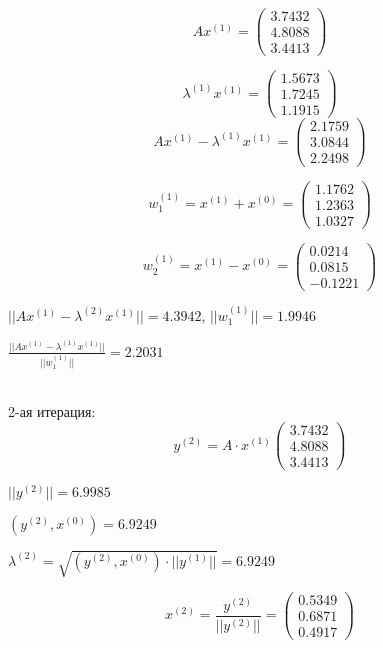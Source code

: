 \documentclass{article}
\begin{document}
	\[Ax^{(1)} =							
	\left(
	\begin{array}{ccc}
		3.7432 \\
		4.8088 \\
		3.4413
	\end{array}
	\right) \]
	
	\[\lambda^{(1)} x^{(1)} =							
	\left(
	\begin{array}{ccc}
		1.5673 \\
		1.7245 \\
		1.1915
	\end{array}
	\right) \]
	\[Ax^{(1)} - \lambda^{(1)} x^{(1)} =							
	\left(
	\begin{array}{ccc}
		2.1759 \\
		3.0844 \\
		2.2498
	\end{array}
	\right) \]
	
	
	\[w^{(1)}_1 =x^{(1)} +  x^{(0)}=							
	\left(
	\begin{array}{ccc}
		1.1762 \\
		1.2363 \\
		1.0327
	\end{array}
	\right) \]
	
	\[w^{(1)}_2 =x^{(1)} -  x^{(0)}=							
	\left(
	\begin{array}{ccc}
		0.0214 \\
		0.0815 \\
		-0.1221 
	\end{array}
	\right) \]
	
	$||Ax^{(1)} - \lambda^{(2)} x^{(1)}|| = 4.3942$,
	$||w^{(1)}_1|| = 1.9946$
	
	$\frac{||Ax^{(1)} - \lambda^{(1)} x^{(1)}||}{||w^{(1)}_1||} = 2.2031$	
	
	
	~\\
	2-ая итерация:
	\[y^{(2)} = A \cdot x^{(1)}							
	\left(
	\begin{array}{ccc}
		3.7432 \\
		4.8088 \\
		3.4413
	\end{array}
	\right) \] 
	
	$||y^{(2)}|| = 6.9985$
	
	$({y^{(2)}},{x^{(0)}}) = 6.9249
	$
	
	$\lambda^{(2)} = \sqrt {{({y^{(2)}},{x^{(0)}})} \cdot ||y^{(1)}||} =  6.9249$
	
	\[x^{(2)} = \frac{y^{(2)}}{||y^{(2)}||}= 							
	\left(
	\begin{array}{ccc}
		0.5349 \\
		0.6871 \\
		0.4917
	\end{array}
	\right) \] 
	
\end{document}
